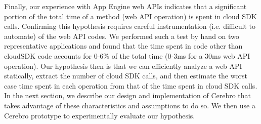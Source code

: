 Finally, our experience with App Engine web APIs indicates that a significant
portion of the total time of a method (web API operation) is spent in cloud SDK calls.
Confirming this hypothesis requires careful instrumentation (i.e. difficult
to automate) of the web API codes.  We performed such a test by hand on two 
representative applications and found that the time spent in code other than cloudSDK code
accounts for $0$-$6$\% of the total time (0-3ms for a 30ms web API operation).
Our hypothesis then is that we can efficiently analyze
a web API statically, extract the number of cloud SDK calls,
and then estimate the worst case time spent in each operation from that of the 
time spent in cloud SDK calls.
In the next section, we describe our design and implementation of Cerebro
that takes advantage of these characteristics and assumptions to do so.
We then use a Cerebro prototype to experimentally evaluate our hypothesis.
